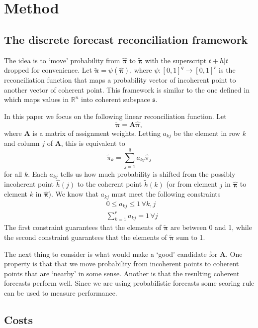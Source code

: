 \documentclass[a4paper,review,12pt,authoryear]{elsarticle}
\newcommand{\bpi}{\bm{\pi}}
\begin{document}
\section{Method}
\label{sec:method}

    \subsection{The discrete forecast reconciliation framework}
    
    The idea is to `move' probability from $\hat{\bpi}$ to $\tilde{\bpi}$ with the superscript $t+h|t$ dropped for convenience.  
    Let $\tilde{\bpi} = \psi(\hat{\bpi})$, where $\psi:[0,1]^q \rightarrow [0,1]^r$ is the reconciliation function that maps a probability vector of incoherent point to another vector of coherent point. 
    This framework is similar to the one defined in \cite{anagiotelisForecastReconciliationGeometric2021} which maps values in $\mathbb{R}^n$ into coherent subspace $\mathfrak{s}$.

    In this paper we focus on the following linear reconciliation function.
    Let
    \[
    \tilde{\bpi}=\bm{A}\hat{\bpi},
    \] 
    where $\bm{A}$ is a matrix of assignment weights. Letting $a_{kj}$ be the element in row $k$ and column $j$ of $\bm{A}$, this is equivalent to
    \[
      \tilde{\pi}_k=\sum\limits_{j=1}^q a_{kj}\hat{{\pi}}_j
    \]
    for all $k$. 
    Each $a_{kj}$ tells us how much probability is shifted from the possibly incoherent point $\hat{h}(j)$ to the coherent point $\tilde{h}(k)$ (or from element $j$ in $\hat{\bpi}$ to element $k$ in $\hat{\bpi}$). We know that $a_{kj}$ must meet the following constraints
    \begin{align*}
    &0\leq a_{kj} \leq 1 \,\forall k, j\\ 
    &\sum\limits_{k=1}^r a_{kj} = 1 \,\forall j 
    \end{align*}
    The first constraint guarantees that the elements of $\tilde{\bpi}$ are between 0 and 1, while the second constraint guarantees that the elements of $\tilde{\bpi}$ sum to 1.
    
    The next thing to consider is what would make a `good' candidate for $\bm{A}$.  One property is that that we move probability from incoherent points to coherent points that are  `nearby' in some sense. Another is that the resulting coherent forecasts perform well.  Since we are using probabilistic forecasts some scoring rule can be used to measure performance.
    
    \subsection{Costs}
    
\end{document}
